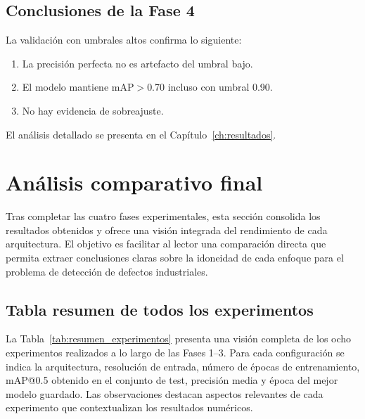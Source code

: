 \subsection{Conclusiones de la Fase 4}

La validación con umbrales altos confirma lo siguiente:
\begin{enumerate}
    \item La precisión perfecta no es artefacto del umbral bajo.
    \item El modelo mantiene mAP$>$0.70 incluso con umbral 0.90.
    \item No hay evidencia de sobreajuste.
\end{enumerate}
El análisis detallado se presenta en el Capítulo~\ref{ch:resultados}.

\FloatBarrier
\section{Análisis comparativo final}
\label{sec:analisis_comparativo}

Tras completar las cuatro fases experimentales, esta sección consolida los resultados obtenidos y ofrece una visión integrada del rendimiento de cada arquitectura. El objetivo es facilitar al lector una comparación directa que permita extraer conclusiones claras sobre la idoneidad de cada enfoque para el problema de detección de defectos industriales.

\subsection{Tabla resumen de todos los experimentos}

La Tabla~\ref{tab:resumen_experimentos} presenta una visión completa de los ocho experimentos realizados a lo largo de las Fases 1--3. Para cada configuración se indica la arquitectura, resolución de entrada, número de épocas de entrenamiento, mAP@0.5 obtenido en el conjunto de test, precisión media y época del mejor modelo guardado. Las observaciones destacan aspectos relevantes de cada experimento que contextualizan los resultados numéricos.


